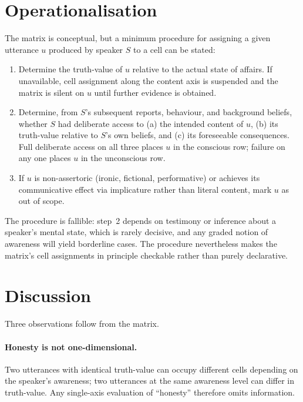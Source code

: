 \documentclass[11pt,a4paper]{article}
\begin{document}
\section{Operationalisation}

The matrix is conceptual, but a minimum procedure for assigning a given
utterance $u$ produced by speaker $S$ to a cell can be stated:

\begin{enumerate}
  \item Determine the truth-value of $u$ relative to the actual state
        of affairs. If unavailable, cell assignment along the content
        axis is suspended and the matrix is silent on $u$ until
        further evidence is obtained.
  \item Determine, from $S$'s subsequent reports, behaviour, and
        background beliefs, whether $S$ had deliberate access to (a)
        the intended content of $u$, (b) its truth-value relative to
        $S$'s own beliefs, and (c) its foreseeable consequences. Full
        deliberate access on all three places $u$ in the conscious
        row; failure on any one places $u$ in the unconscious row.
  \item If $u$ is non-assertoric (ironic, fictional, performative) or
        achieves its communicative effect via implicature rather than
        literal content, mark $u$ as out of scope.
\end{enumerate}

\noindent
The procedure is fallible: step~2 depends on testimony or inference
about a speaker's mental state, which is rarely decisive, and any
graded notion of awareness will yield borderline cases. The procedure
nevertheless makes the matrix's cell assignments in principle
checkable rather than purely declarative.

\section{Discussion}

Three observations follow from the matrix.

\paragraph{Honesty is not one-dimensional.} Two utterances with
identical truth-value can occupy different cells depending on the
speaker's awareness; two utterances at the same awareness level can
differ in truth-value. Any single-axis evaluation of ``honesty''
therefore omits information.
\end{document}
